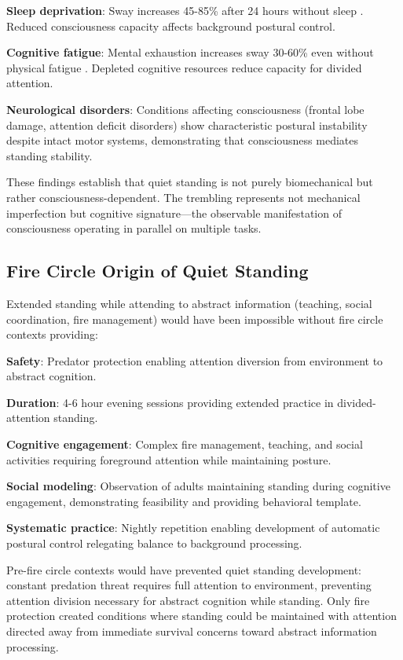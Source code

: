 \documentclass[12pt,a4paper]{article}
\begin{document}
\textbf{Sleep deprivation}: Sway increases 45-85\% after 24 hours without sleep \citep{robillard2011sleep}. Reduced consciousness capacity affects background postural control.

\textbf{Cognitive fatigue}: Mental exhaustion increases sway 30-60\% even without physical fatigue \citep{lorist2002mental}. Depleted cognitive resources reduce capacity for divided attention.

\textbf{Neurological disorders}: Conditions affecting consciousness (frontal lobe damage, attention deficit disorders) show characteristic postural instability despite intact motor systems, demonstrating that consciousness mediates standing stability.

These findings establish that quiet standing is not purely biomechanical but rather consciousness-dependent. The trembling represents not mechanical imperfection but cognitive signature—the observable manifestation of consciousness operating in parallel on multiple tasks.

\subsection{Fire Circle Origin of Quiet Standing}

Extended standing while attending to abstract information (teaching, social coordination, fire management) would have been impossible without fire circle contexts providing:

\textbf{Safety}: Predator protection enabling attention diversion from environment to abstract cognition.

\textbf{Duration}: 4-6 hour evening sessions providing extended practice in divided-attention standing.

\textbf{Cognitive engagement}: Complex fire management, teaching, and social activities requiring foreground attention while maintaining posture.

\textbf{Social modeling}: Observation of adults maintaining standing during cognitive engagement, demonstrating feasibility and providing behavioral template.

\textbf{Systematic practice}: Nightly repetition enabling development of automatic postural control relegating balance to background processing.

Pre-fire circle contexts would have prevented quiet standing development: constant predation threat requires full attention to environment, preventing attention division necessary for abstract cognition while standing. Only fire protection created conditions where standing could be maintained with attention directed away from immediate survival concerns toward abstract information processing.
\end{document}
